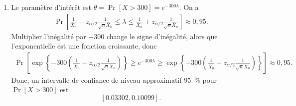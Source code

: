 \begin{solution}{5.12}
\begin{enumerate}
\item Le paramètre d'intérêt est $\theta=\Pr[X>300]=e^{-300\lambda}$. On a
\begin{align*}
\Pr\left[\frac{1}{\bar X_n}-z_{\alpha/2}\frac{1}{\sqrt{n}\bar X_n}\leq \lambda \leq \frac{1}{\bar X_n}+z_{\alpha/2}\frac{1}{\sqrt{n}\bar X_n}\right]\approx 0,95.
\end{align*}
Multiplier l'inégalité par $-300$ change le signe d'inégalité, alors que l'exponentielle est une fonction croissante, donc
\begin{align*}
\Pr\left[\exp\left\{-300\left(\frac{1}{\bar X_n}-z_{\alpha/2}\frac{1}{\sqrt{n}\bar X_n}\right)\right\}\geq e^{-300\lambda} \geq \exp\left\{-300\left(\frac{1}{\bar X_n}+z_{\alpha/2}\frac{1}{\sqrt{n}\bar X_n}\right)\right\}\right]\approx 0,95.
\end{align*}
Donc, un intervalle de confiance de niveau approximatif $95$~\% pour $\Pr[X>300]$ est
$$
\left[0.03302,0.10099\right].
$$
\end{enumerate}
\end{solution}
